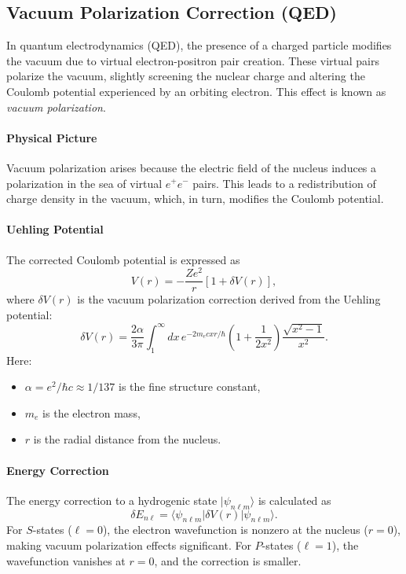\documentclass[12pt]{article}
\begin{document}
\subsection{Vacuum Polarization Correction (QED)}\label{subsec:vacuum_polarization_correction}

In quantum electrodynamics (QED), the presence of a charged particle modifies the vacuum due to virtual electron-positron pair creation. These virtual pairs polarize the vacuum, slightly screening the nuclear charge and altering the Coulomb potential experienced by an orbiting electron. This effect is known as \emph{vacuum polarization}.

\paragraph{Physical Picture}
Vacuum polarization arises because the electric field of the nucleus induces a polarization in the sea of virtual \(e^+e^-\) pairs. This leads to a redistribution of charge density in the vacuum, which, in turn, modifies the Coulomb potential.

\paragraph{Uehling Potential}
The corrected Coulomb potential is expressed as
\[
V(r) = -\frac{Ze^2}{r}\left[1+\delta V(r)\right],
\]
where \(\delta V(r)\) is the vacuum polarization correction derived from the Uehling potential:
\[
\delta V(r) = \frac{2\alpha}{3\pi}\int_1^\infty dx\, e^{-2m_e c x r/\hbar}\left(1+\frac{1}{2x^2}\right)\frac{\sqrt{x^2-1}}{x^2}.
\]
Here:
\begin{itemize}
    \item \(\alpha = e^2/\hbar c \approx 1/137\) is the fine structure constant,
    \item \(m_e\) is the electron mass,
    \item \(r\) is the radial distance from the nucleus.
\end{itemize}

\paragraph{Energy Correction}
The energy correction to a hydrogenic state \(|\psi_{n\ell m}\rangle\) is calculated as
\[
\delta E_{n\ell} = \langle \psi_{n\ell m} | \delta V(r) | \psi_{n\ell m} \rangle.
\]
For \(S\)-states (\(\ell=0\)), the electron wavefunction is nonzero at the nucleus (\(r=0\)), making vacuum polarization effects significant. For \(P\)-states (\(\ell=1\)), the wavefunction vanishes at \(r=0\), and the correction is smaller.
\end{document}
